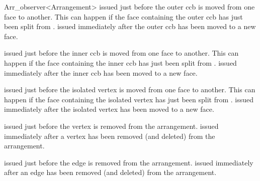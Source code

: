 \begin{ccRefClass}{Arr_observer<Arrangement>}
    {issued just before the outer ccb  is moved from one face to another.
     This can happen if the face  containing the outer ccb has just
     been split from .}
\ccGlue
{}
    {issued immediately after the outer ccb  has been moved to a new face.}

    {issued just before the inner ccb  is moved from one face to another.
     This can happen if the face  containing the inner ccb has just
     been split from .}
\ccGlue
{}
    {issued immediately after the inner ccb  has been moved to a new face.}

    {issued just before the isolated vertex  is moved from one face
     to another.
     This can happen if the face  containing the isolated vertex
     has just been split from .}
\ccGlue
{}
    {issued immediately after the isolated vertex  has been moved to a 
     new face.}

    {issued just before the vertex  is removed from the arrangement.}
\ccGlue
{}
    {issued immediately after a vertex has been removed (and deleted)
     from the arrangement.}
%

    {issued just before the edge  is removed from the arrangement.}
\ccGlue
{}
    {issued immediately after an edge has been removed (and deleted)
     from the arrangement.}


\end{ccRefClass}
